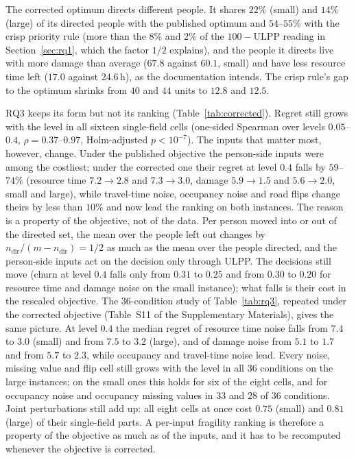 \documentclass[systems,article,accept,moreauthors,pdftex]{Definitions/mdpi}
\begin{document}
The corrected optimum directs different people. It shares $22\%$ (small) and $14\%$ (large) of
its directed people with the published optimum and $54$--$55\%$ with the crisp priority rule (more than the $8\%$ and $2\%$ of the
$100-\mathrm{ULPP}$ reading in Section~\ref{sec:rq1}, which the factor $1/2$ explains), and
the people it directs live with more damage than average ($67.8$ against $60.1$, small) and have
less resource time left ($17.0$ against $24.6$\,h), as the documentation intends. The crisp
rule's gap to the optimum shrinks from $40$ and $44$ units to $12.8$ and $12.5$.


RQ3 keeps its form but not its ranking (Table~\ref{tab:corrected}). Regret still grows with the
level in all sixteen single-field cells (one-sided Spearman over levels $0.05$--$0.4$,
$\rho = 0.37$--$0.97$, Holm-adjusted $p < 10^{-7}$). The inputs that matter most, however,
change. Under the published objective the person-side inputs were among the costliest; under the
corrected one their regret at level $0.4$ falls by $59$--$74\%$ (resource time $7.2 \to 2.8$ and
$7.3 \to 3.0$, damage $5.9 \to 1.5$ and $5.6 \to 2.0$, small and large), while travel-time noise,
occupancy noise and road flips change theirs by less than $10\%$ and now lead the ranking on both
instances. The reason is a property of the objective, not of the data. Per person moved into or
out of the directed set, the mean over the people left out changes by
$n_{\mathrm{dir}}/(m - n_{\mathrm{dir}}) = 1/2$ as much as the mean over the people directed, and
the person-side inputs act on the decision only through ULPP. The decisions still move (churn
at level $0.4$ falls only from $0.31$ to $0.25$ and from $0.30$ to $0.20$ for resource time and
damage noise on the small instance); what falls is their cost in the rescaled objective. The
36-condition study of Table~\ref{tab:rq3}, repeated under the corrected objective (Table~S11 of
the Supplementary Materials), gives the same picture. At level $0.4$ the median regret of
resource time noise falls from $7.4$ to $3.0$ (small) and from $7.5$ to $3.2$ (large), and of
damage noise from $5.1$ to $1.7$ and from $5.7$ to $2.3$, while occupancy and travel-time noise
lead. Every noise, missing value and flip cell still grows with the level in all $36$ conditions
on the large instances; on the small ones this holds for six of the eight cells, and for
occupancy noise and occupancy missing values in $33$ and $28$ of $36$ conditions. Joint
perturbations still add up: all eight cells at once cost $0.75$ (small) and $0.81$ (large) of
their single-field parts. A
per-input fragility ranking is
therefore a property of the objective as much as of the inputs, and it has to be recomputed
whenever the objective is corrected.
\end{document}
